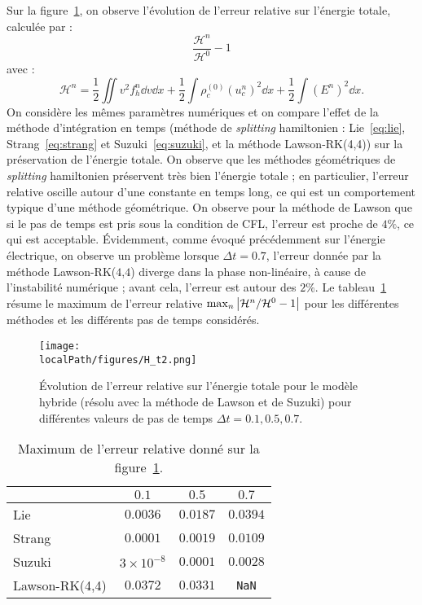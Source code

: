 Sur la figure~\ref{fig:H:t2}, on observe l'évolution de l'erreur relative sur l'énergie totale, calculée par :
\begin{equation}
	\frac{\mathcal{H}^n}{\mathcal{H}^0}-1
	\label{eq:relativeerror:H}
\end{equation}
avec :
$$
  \mathcal{H}^n = \frac{1}{2}\iint v^2f_h^n\dd{v}\dd{x}
                + \frac{1}{2}\int\rho_c^{(0)}\left(u_c^n\right)^2\dd{x}
                + \frac{1}{2}\int\left(E^n\right)^2\dd{x}.
$$
On considère les mêmes paramètres numériques et on compare l'effet de la méthode d'intégration en temps (méthode de \emph{splitting} hamiltonien : Lie~\eqref{eq:lie}, Strang~\eqref{eq:strang} et Suzuki~\eqref{eq:suzuki}, et la méthode Lawson-RK(4,4)) sur la préservation de l'énergie totale. On observe que les méthodes géométriques de \emph{splitting} hamiltonien préservent très bien l'énergie totale ; en particulier, l'erreur relative oscille autour d'une constante en temps long, ce qui est un comportement typique d'une méthode géométrique. On observe pour la méthode de Lawson que si le pas de temps est pris sous la condition de CFL, l'erreur est proche de $4\%$, ce qui est acceptable. Évidemment, comme évoqué précédemment sur l'énergie électrique, on observe un problème lorsque $\Delta t=0.7$, l'erreur donnée par la méthode Lawson-RK($4$,$4$) diverge dans la phase non-linéaire, à cause de l'instabilité numérique ; avant cela, l'erreur est autour des $2\%$. Le tableau~\ref{tab:H:max} résume le maximum de l'erreur relative $\max_n \left| {\cal H}^n / {\cal H}^0 -1 \right|$ pour les différentes méthodes et les différents pas de temps considérés.

\begin{figure}[h]
  \centering
  \texttt{[image: \\localPath/figures/H\_t2.png]}
  \caption{Évolution de l'erreur relative sur l'énergie totale pour le modèle hybride (résolu avec la méthode de Lawson et de Suzuki) pour différentes valeurs de pas de temps $\Delta t=0.1,0.5,0.7$.}
  \label{fig:H:t2}
\end{figure}

\begin{table}[h]
  \centering
  \begin{tabular}{l|c|c|c}
                   & $0.1$             & $0.5$     & $0.7$        \\
    \hline
    Lie            & $0.0036$          & $0.0187$  & $0.0394$     \\
    Strang         & $0.0001$          & $0.0019$  & $0.0109$     \\
    Suzuki         & $3\times 10^{-8}$ & $0.0001$  & $0.0028$     \\
    Lawson-RK(4,4) & $0.0372$          & $0.0331$  & \texttt{NaN} \\
  \end{tabular}
  \caption{Maximum de l'erreur relative donné sur la figure~\ref{fig:H:t2}.}
  \label{tab:H:max}
\end{table}

